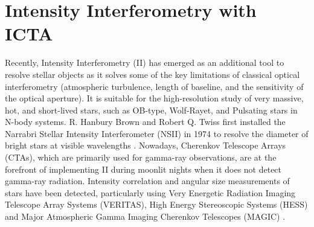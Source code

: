 \section{Intensity Interferometry with ICTA}
Recently, Intensity Interferometry (II) has emerged as an additional tool to resolve stellar objects as it solves some of the key limitations of classical optical interferometry (atmospheric turbulence, length of baseline, and the sensitivity of the optical aperture). It is suitable for the high-resolution study of very massive, hot, and short-lived stars, such as OB-type, Wolf-Rayet, and Pulsating stars in N-body systems. R. Hanbury Brown and Robert Q. Twiss first installed the Narrabri Stellar Intensity Interferometer (NSII) in 1974 to resolve the diameter of bright stars at visible wavelengths \citep{brown1954lxxiv, brown1974intensity}. Nowadays, Cherenkov Telescope Arrays (CTAs), which are primarily used for gamma-ray observations, are at the forefront of implementing II during moonlit nights when it does not detect gamma-ray radiation. Intensity correlation and angular size measurements of stars have been detected, particularly using Very Energetic Radiation Imaging Telescope Array Systems (VERITAS), High Energy Stereoscopic Systems (HESS) and Major Atmospheric Gamma Imaging Cherenkov Telescopes (MAGIC) \citep{kieda2022performance, zmija2022optical, abe2024performance}.

